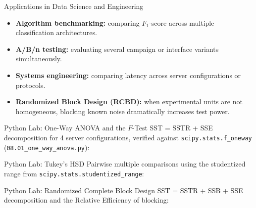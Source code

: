 \documentclass[10pt, aspectratio=169]{beamer}
\begin{document}
\begin{frame}{Applications in Data Science and Engineering}
  \footnotesize
  \begin{itemize}\itemsep=0.1cm
    \item \textbf{Algorithm benchmarking:} comparing $F_1$-score across multiple classification architectures. \pause
    \item \textbf{A/B/n testing:} evaluating several campaign or interface variants simultaneously. \pause
    \item \textbf{Systems engineering:} comparing latency across server configurations or protocols. \pause
    \item \textbf{Randomized Block Design (RCBD):} when experimental units are not homogeneous, blocking known noise dramatically increases test power.
  \end{itemize}
\end{frame}

\begin{frame}[fragile]{Python Lab: One-Way ANOVA and the $F$-Test}
  \scriptsize
  SST = SSTR + SSE decomposition for 4 server configurations, verified against \texttt{scipy.stats.f\_oneway} (\texttt{08.01\_one\_way\_anova.py}):
  {
  }
\end{frame}

\begin{frame}[fragile]{Python Lab: Tukey's HSD}
  \scriptsize
  Pairwise multiple comparisons using the studentized range from \texttt{scipy.stats.studentized\_range}:
  {
  }
\end{frame}

\begin{frame}[fragile]{Python Lab: Randomized Complete Block Design}
  \scriptsize
  SST = SSTR + SSB + SSE decomposition and the Relative Efficiency of blocking:
  {
  }
\end{frame}
\end{document}

